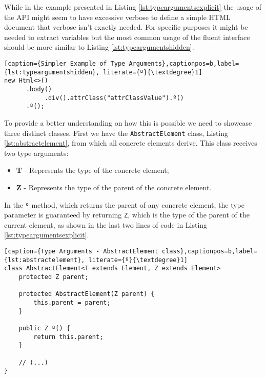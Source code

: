 \noindent
While in the example presented in Listing \ref{lst:typeargumentsexplicit} the usage of the \ac{API} might seem to have excessive verbose to define a simple \ac{HTML} document that verbose isn't exactly needed. For specific purposes it might be needed to extract variables but the most common usage of the fluent interface should be more similar to Listing \ref{lst:typeargumentshidden}.  

\bigskip


\begin{minipage}{\linewidth}
\begin{lstlisting}[caption={Simpler Example of Type Arguments},captionpos=b,label={lst:typeargumentshidden}, literate={º}{\textdegree}1]
new Html<>()
      .body()
           .div().attrClass("attrClassValue").º()
      .º();
\end{lstlisting}
\end{minipage}

\noindent
To provide a better understanding on how this is possible we need to showcase three distinct classes. First we have the \texttt{AbstractElement} class, Listing \ref{lst:abstractelement}, from which all concrete elements derive. This class receives two type arguments: 

\begin{itemize}
	\item \textbf{T} - Represents the type of the concrete element; 
	\item \textbf{Z} - Represents the type of the parent of the concrete element.
\end{itemize}	


\noindent
In the \texttt{º} method, which returns the parent of any concrete element, the type parameter is guaranteed by returning \texttt{Z}, which is the type of the parent of the current element, as shown in the last two lines of code in Listing \ref{lst:typeargumentsexplicit}.

\bigskip

\begin{minipage}{\linewidth}
\begin{lstlisting}[caption={Type Arguments - AbstractElement class},captionpos=b,label={lst:abstractelement}, literate={º}{\textdegree}1]
class AbstractElement<T extends Element, Z extends Element>
	protected Z parent;
	
    protected AbstractElement(Z parent) {
        this.parent = parent;
    }	
	
	public Z º() {
		return this.parent;
	}
	
	// (...)
}
\end{lstlisting}
\end{minipage}

